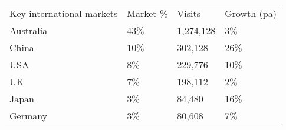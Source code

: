 \begin{tabular}[t]{p{3.3cm}>{\hfill}p{1.1cm}>{\hfill}p{1.3cm}>{\hfill}p{1.4cm}}
 Key international markets & Market \% & Visits & Growth (pa) \\ 
 Australia & 43\% & 1,274,128 & 3\% \\ 
  China & 10\% &   302,128 & 26\% \\ 
  USA & 8\% &   229,776 & 10\% \\ 
  UK & 7\% &   198,112 & 2\% \\ 
  Japan & 3\% &    84,480 & 16\% \\ 
  Germany & 3\% &    80,608 & 7\% \\ 
  \end{tabular}

